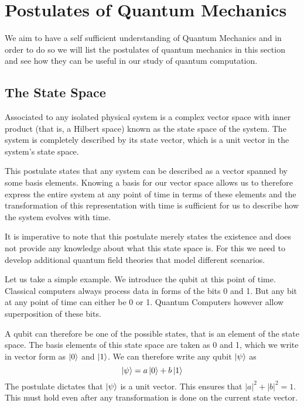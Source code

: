 \chapter{Postulates of Quantum Mechanics}

We aim to have a self sufficient understanding of Quantum Mechanics and in order to do so we will list the postulates of quantum mechanics in this section and see how they can be useful in our study of quantum computation.

\section{The State Space}
\begin{postulate}
Associated to any isolated physical system is a complex vector space
with inner product (that is, a Hilbert space) known as the state space of the system. The system is completely described by its state vector, which is a unit vector in the system’s state space.
\end{postulate}

This postulate states that any system can be described as a vector spanned by some basis elements. Knowing a basis for our vector space allows us to therefore express the entire system at any point of time in terms of these elements and the transformation of this representation with time is sufficient  for us to describe how the system evolves with time.

It is imperative to note that this postulate merely states the existence and does not provide any knowledge about what this state space is. For this we need to develop additional quantum field theories that model different scenarios. 

Let us take a simple example. We introduce the qubit at this point of time. Classical computers always process data in forms of the bits 0 and 1. But any bit at any point of time can either be 0 or 1. Quantum Computers however allow superposition of these bits.

A qubit can therefore be one of the possible states, that is an element of the state space. The basis elements of this state space are taken as 0 and 1, which we write in vector form as $\ket{0}$ and $\ket{1}$. 
We can therefore write any qubit $\ket{\psi}$ as 
$$\ket{\psi} = a\ket{0} + b\ket{1}$$
The postulate dictates that $\ket{\psi}$ is a unit vector. This ensures that $|a|^2 + |b|^2 = 1$. This must hold even after any transformation is done on the current state vector.

